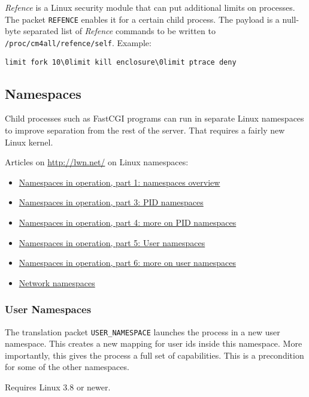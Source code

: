 \documentclass[a4paper,12pt]{article}
\begin{document}
\emph{Refence} is a Linux security module that can put additional
limits on processes.  The packet \verb|REFENCE| enables it for a
certain child process.  The payload is a null-byte separated list of
\emph{Refence} commands to be written to
\texttt{/proc/cm4all/refence/self}.  Example:

\begin{verbatim}
limit fork 10\0limit kill enclosure\0limit ptrace deny
\end{verbatim}


\subsection{Namespaces}
\label{ns}

Child processes such as FastCGI programs can run in separate Linux
namespaces to improve separation from the rest of the server.  That
requires a fairly new Linux kernel.

Articles on \url{http://lwn.net/} on Linux namespaces:

\begin{itemize}
\item \href{https://lwn.net/Articles/531114/}{Namespaces in operation,
  part 1: namespaces overview}
\item \href{http://lwn.net/Articles/531419/}{Namespaces in operation,
  part 3: PID namespaces}
\item \href{http://lwn.net/Articles/532748/}{Namespaces in operation,
  part 4: more on PID namespaces}
\item \href{http://lwn.net/Articles/532593/}{Namespaces in operation,
  part 5: User namespaces}
\item \href{https://lwn.net/Articles/540087/}{Namespaces in operation,
  part 6: more on user namespaces}
\item \href{http://lwn.net/Articles/219794/}{Network namespaces}
\end{itemize}

\subsubsection{User Namespaces}

The translation packet \verb|USER_NAMESPACE| launches the process in a
new user namespace.  This creates a new mapping for user ids inside
this namespace.  More importantly, this gives the process a full set
of capabilities.  This is a precondition for some of the other
namespaces.

Requires Linux 3.8 or newer.
\end{document}
